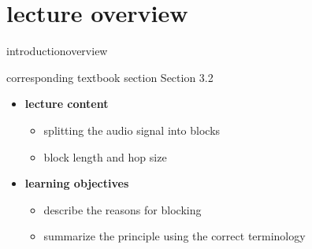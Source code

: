 


\subtitle{Module 3.2: Fundamentals~---~Blocking}


	

    \section[overview]{lecture overview}
        \begin{frame}{introduction}{overview}
            \begin{block}{corresponding textbook section}
                Section 3.2
            \end{block}

            \begin{itemize}
                \item   \textbf{lecture content}
                    \begin{itemize}
                        \item   splitting the audio signal into blocks
                        \item   block length and hop size
                    \end{itemize}
                \bigskip
                \item<2->   \textbf{learning objectives}
                    \begin{itemize}
                        \item   describe the reasons for blocking
                        \item   summarize the principle using the correct terminology
                    \end{itemize}
            \end{itemize}
        \end{frame}

